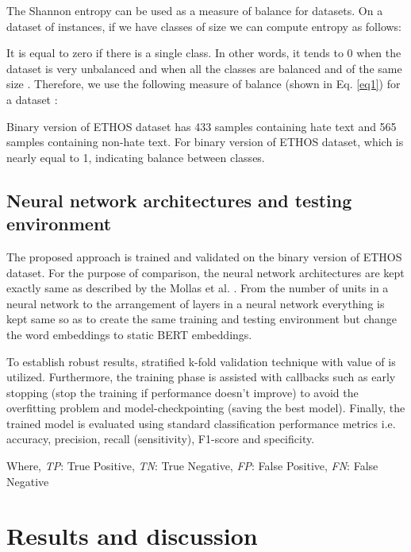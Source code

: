 \documentclass[runningheads]{llncs}
\begin{document}
The Shannon entropy can be used as a measure of balance for datasets. On a dataset of  instances, if we have  classes of size  we can compute entropy as follows:

It is equal to zero if there is a single class. In other words, it tends to 0 when the dataset is very unbalanced and   when all the classes are balanced and of the same size . Therefore, we use the following measure of balance (shown in Eq. \ref{eq1}) for a dataset \cite{cross_validated_2016}:

 
 Binary version of ETHOS dataset has 433 samples containing hate text and 565 samples containing non-hate text. For binary version of ETHOS dataset,  which is nearly equal to 1, indicating balance between classes.

\subsection{Neural network architectures and testing environment}
The proposed approach is trained and validated on the binary version of ETHOS dataset. For the purpose of comparison, the neural network architectures are kept exactly same as described by the Mollas et al. \cite{mollas2020ethos}. From the number of units in a neural network to the arrangement of layers in a neural network everything is kept same so as to create the same training and testing environment but change the word embeddings to static BERT embeddings.

To establish robust results, stratified k-fold validation technique with value of  is utilized. Furthermore, the training phase is assisted with callbacks such as early stopping (stop the training if performance doesn't improve) to avoid the overfitting problem and model-checkpointing (saving the best model). Finally, the trained model is evaluated using standard classification performance metrics i.e. accuracy, precision, recall (sensitivity), F1-score and specificity.










Where,
\textit{TP}: True Positive, \textit{TN}: True Negative,  \textit{FP}: False Positive, \textit{FN}: False Negative

\section{Results and discussion}
\end{document}
